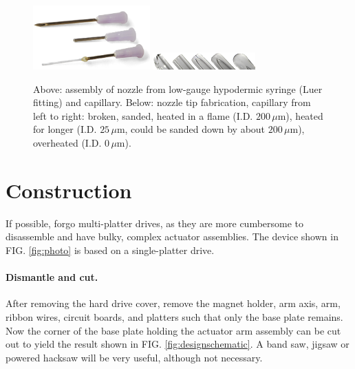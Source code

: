 \documentclass[aip,rsi,reprint,graphicx]{revtex4-1} %
\begin{document}
\begin{figure}
\centering
\includegraphics[width=0.4\textwidth]{hdg_images/needles.png}
\includegraphics[width=0.35\textwidth]{hdg_images/needletips.png}
\caption{Above: assembly of nozzle from
low-gauge hypodermic syringe (Luer fitting) and capillary. Below: nozzle tip
fabrication, capillary from left to right: broken, sanded, heated in a flame (I.D.
$200\,\mu$m), heated for longer (I.D. $25\,\mu$m, could be sanded down by about
$200\,\mu$m), overheated (I.D. $0\,\mu$m). \label{fig:needles}}
\end{figure}


\section{Construction}
If possible, forgo multi-platter drives, as they are more cumbersome to disassemble and have
bulky, complex actuator assemblies. The device shown in FIG. \ref{fig:photo}
is based on a single-platter drive.

\paragraph{Dismantle and cut.} After removing the hard drive cover, remove
the magnet holder, arm axis, arm, ribbon wires, circuit boards, and platters
such that only the base plate remains. Now the corner of the base plate holding
the actuator arm assembly can be cut out to yield the result shown in FIG.
\ref{fig:designschematic}. A band saw, jigsaw or powered hacksaw will be very
useful, although not necessary.
\end{document}

